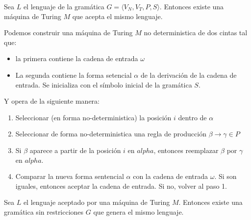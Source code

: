 \begin{teorema}
  Sea \(L\) el lenguaje de la gramática \(G = \langle V_N, V_T, P, S\rangle\). Entonces existe una máquina de Turing \(M\) que acepta el mismo lenguaje.
\end{teorema}

\begin{demo}[0.8\textwidth]
  Podemos construir una máquina de Turing \(M\) no deterministica de dos cintas tal que:
  \begin{itemize}
    \item la primera contiene la cadena de entrada \(\omega\)
    \item La segunda contiene la forma setencial \(\alpha\) de la derivación de la cadena de entrada. Se inicializa con el símbolo inicial de la gramática \(S\).
  \end{itemize}

  Y opera de la siguiente manera:
  \begin{enumerate}
    \item Seleccionar (en forma no-deterministica) la posición \(i\) dentro de \(\alpha\)
    \item Seleccionar de forma no-deterministica una regla de producción \(\beta \rightarrow \gamma\in P\)
    \item Si \(\beta\) aparece a partir de la posición \(i\) en \(alpha\), entonces reemplazar \(\beta\) por \(\gamma\) en \(alpha\).
    \item Comparar la nueva forma sentencial \(\alpha\) con la cadena de entrada \(\omega\). Si son iguales, entonces aceptar la cadena de entrada. Si no, volver al paso 1.
  \end{enumerate}
\end{demo}

\begin{teorema}
  Sea \(L\) el lenguaje aceptado por una máquina de Turing \(M\). Entonces existe una gramática sin restricciones \(G\) que genera el mismo lenguaje.
\end{teorema}


